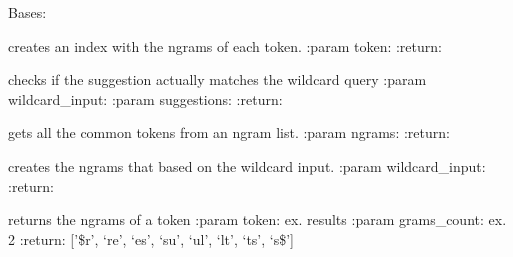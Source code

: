 \documentclass[letterpaper,10pt,english]{sphinxmanual}
\begin{document}
\begin{fulllineitems}
\label{\detokenize{ngrams:ngrams.NGramIndex}}
Bases: 

\begin{fulllineitems}
\label{\detokenize{ngrams:ngrams.NGramIndex.index_token}}
creates an index with the ngrams of each token.
:param token:
:return:

\end{fulllineitems}


\begin{fulllineitems}
\label{\detokenize{ngrams:ngrams.NGramIndex.post_filtering}}
checks if the suggestion actually matches the wildcard query
:param wildcard\_input:
:param suggestions:
:return:

\end{fulllineitems}


\begin{fulllineitems}
\label{\detokenize{ngrams:ngrams.NGramIndex.suggestions}}
gets all the common tokens from an ngram list.
:param ngrams:
:return:

\end{fulllineitems}


\begin{fulllineitems}
\label{\detokenize{ngrams:ngrams.NGramIndex.wildcard_ngrams}}
creates the ngrams that based on the wildcard input.
:param wildcard\_input:
:return:

\end{fulllineitems}


\end{fulllineitems}


\begin{fulllineitems}
\label{\detokenize{ngrams:ngrams.get_n_grams}}
returns the ngrams of a token
:param token: ex. results
:param grams\_count: ex. 2
:return: {[}'\$r', `re', `es', `su', `ul', `lt', `ts', `s\$'{]}

\end{fulllineitems}
\end{document}
